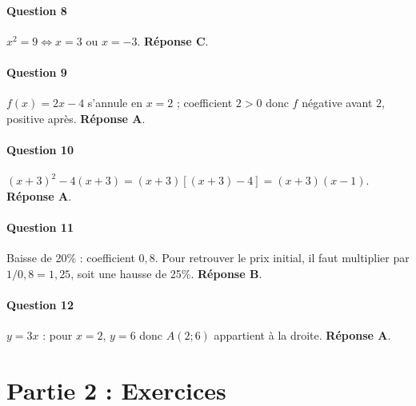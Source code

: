 \documentclass[a4paper, 12pt]{article}
\begin{document}
\paragraph{Question 8}
$x^2 = 9 \iff x = 3$ ou $x = -3$. \textbf{Réponse C}.

\paragraph{Question 9}
$f(x)=2x-4$ s’annule en $x=2$ ; coefficient $2>0$ donc $f$ négative avant $2$, positive après. \textbf{Réponse A}.

\paragraph{Question 10}
$(x+3)^2 - 4(x+3) = (x+3)[(x+3)-4] = (x+3)(x-1)$. \textbf{Réponse A}.

\paragraph{Question 11}
Baisse de 20\% : coefficient $0,8$. Pour retrouver le prix initial, il faut multiplier par $1/0,8 = 1,25$, soit une hausse de 25\%. \textbf{Réponse B}.

\paragraph{Question 12}
$y=3x$ : pour $x=2$, $y=6$ donc $A(2;6)$ appartient à la droite. \textbf{Réponse A}.

\section*{Partie 2 : Exercices}
\end{document}
